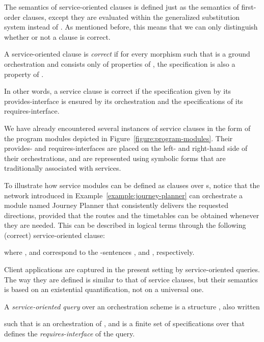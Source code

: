 \documentclass{LMCS}
\begin{document}
  The semantics of service-oriented clauses is defined just as the semantics of first-order clauses, except they are evaluated within the generalized substitution system  instead of .
  As mentioned before, this means that we can only distinguish whether or not a clause is correct.

  \begin{defi}
    A service-oriented clause  is \emph{correct} if for every morphism  such that  is a ground orchestration and  consists only of properties of , the specification  is also a property of .
  \end{defi}

  \noindent In other words, a service clause is correct if the specification given by its provides-interface is ensured by its orchestration and the specifications of its requires-interface.

  \begin{exa}
    \label{example:journey-planner-module}
    We have already encountered several instances of service clauses in the form of the program modules depicted in Figure~\ref{figure:program-modules}.  Their provides- and requires-interfaces are placed on the left- and right-hand side of their orchestrations, and are represented using symbolic forms that are traditionally associated with services.

    To illustrate how service modules can be defined as clauses over s, notice that the network  introduced in Example~\ref{example:journey-planner} can orchestrate a module named Journey Planner that consistently delivers the requested directions, provided that the routes and the timetables can be obtained whenever they are needed.
    This can be described in logical terms through the following (correct) service-oriented clause:
    
    where ,  and  correspond to the \nb-sentences
    ,
     and
    , respectively.
  \end{exa}

  Client applications are captured in the present setting by service-oriented queries.
  The way they are defined is similar to that of service clauses, but their semantics is based on an existential quantification, not on a universal one.

  \begin{defi}
    A \emph{service-oriented query} over an orchestration scheme  is a structure , also written
    
    such that  is an orchestration of , and  is a finite set of specifications over  that defines the \emph{requires-interface} of the query.
  \end{defi}
\end{document}
